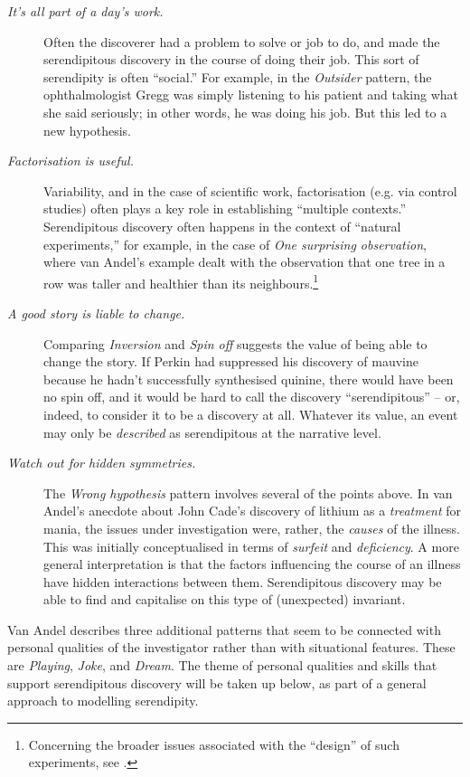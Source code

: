 \begin{description}
\item[\emph{It's all part of a day's work.}] Often the discoverer had
  a problem to solve or job to do, and made the serendipitous
  discovery in the course of doing their job.  This sort of
  serendipity is often ``social.''  For example, in the
  \emph{Outsider} pattern, the ophthalmologist Gregg was simply
  listening to his patient and taking what she said seriously; in
  other words, he was doing his job.  But this led to a new
  hypothesis.
\item[\emph{Factorisation is useful.}] Variability, and in the case of
  scientific work, factorisation (e.g. via control studies) often
  plays a key role in establishing ``multiple contexts.''
  Serendipitous discovery often happens in the context of ``natural
  experiments,'' for example, in the case of \emph{One surprising
    observation}, where van Andel's example dealt with the observation
  that one tree in a row was taller and healthier than its
  neighbours.\footnote{Concerning the broader issues associated with
    the ``design'' of such experiments, see
    \cite{imbens1994identification}.}
\item[\emph{A good story is liable to change.}] Comparing
  \emph{Inversion} and \emph{Spin off} suggests the value of being
  able to change the story.  If Perkin had suppressed his discovery of
  mauvine because he hadn't successfully synthesised quinine, there
  would have been no spin off, and it would be hard to call the
  discovery ``serendipitous'' -- or, indeed, to consider it to be a
  discovery at all.  Whatever its value, an event may only be
  \emph{described} as serendipitous at the narrative level.
\item[\emph{Watch out for hidden symmetries.}] The \emph{Wrong
  hypothesis} pattern involves several of the points above.  In van
  Andel's anecdote about John Cade's discovery of lithium as a
  \emph{treatment} for mania, the issues under investigation were,
  rather, the \emph{causes} of the illness.  This was initially
  conceptualised in terms of \emph{surfeit} and \emph{deficiency}.  A
  more general interpretation is that the factors influencing the
  course of an illness have hidden interactions between them.
  Serendipitous discovery may be able to find and capitalise on this
  type of (unexpected) invariant.
\end{description}

Van Andel describes three additional patterns that seem to be
connected with personal qualities of the investigator rather than with
situational features.  These are \emph{Playing}, \emph{Joke}, and
\emph{Dream}.  The theme of personal qualities and skills that support
serendipitous discovery will be taken up below, as part of a general
approach to modelling serendipity.


